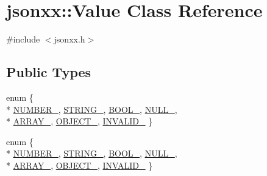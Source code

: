 \hypertarget{classjsonxx_1_1_value}{}\section{jsonxx\+:\+:Value Class Reference}
\label{classjsonxx_1_1_value}


{\ttfamily \#include $<$jsonxx.\+h$>$}

\subsection*{Public Types}
\begin{DoxyCompactItemize}
\item 
enum \{ \\*
\hyperlink{classjsonxx_1_1_value_a20ed4eff7fd265232bfe9e79596ef857a6ef14e8ac168b8fdb1c5dfbfb583045b}{N\+U\+M\+B\+E\+R\+\_\+}, 
\hyperlink{classjsonxx_1_1_value_a20ed4eff7fd265232bfe9e79596ef857a12bc209f234f8b9931d9feaf92e2ba6c}{S\+T\+R\+I\+N\+G\+\_\+}, 
\hyperlink{classjsonxx_1_1_value_a20ed4eff7fd265232bfe9e79596ef857af791553b8f44402500e914c3de70e2e2}{B\+O\+O\+L\+\_\+}, 
\hyperlink{classjsonxx_1_1_value_a20ed4eff7fd265232bfe9e79596ef857a471af58b0c22963c3681bb50fddde57d}{N\+U\+L\+L\+\_\+}, 
\\*
\hyperlink{classjsonxx_1_1_value_a20ed4eff7fd265232bfe9e79596ef857a28a56178628825e168fa96a11a0e4c22}{A\+R\+R\+A\+Y\+\_\+}, 
\hyperlink{classjsonxx_1_1_value_a20ed4eff7fd265232bfe9e79596ef857a50a41ceef6dc2ae9f969388fcff1c05f}{O\+B\+J\+E\+C\+T\+\_\+}, 
\hyperlink{classjsonxx_1_1_value_a20ed4eff7fd265232bfe9e79596ef857a87a10dce222b49f4346f10ce5793fd38}{I\+N\+V\+A\+L\+I\+D\+\_\+}
 \}
\item 
enum \{ \\*
\hyperlink{classjsonxx_1_1_value_a20ed4eff7fd265232bfe9e79596ef857a6ef14e8ac168b8fdb1c5dfbfb583045b}{N\+U\+M\+B\+E\+R\+\_\+}, 
\hyperlink{classjsonxx_1_1_value_a20ed4eff7fd265232bfe9e79596ef857a12bc209f234f8b9931d9feaf92e2ba6c}{S\+T\+R\+I\+N\+G\+\_\+}, 
\hyperlink{classjsonxx_1_1_value_a20ed4eff7fd265232bfe9e79596ef857af791553b8f44402500e914c3de70e2e2}{B\+O\+O\+L\+\_\+}, 
\hyperlink{classjsonxx_1_1_value_a20ed4eff7fd265232bfe9e79596ef857a471af58b0c22963c3681bb50fddde57d}{N\+U\+L\+L\+\_\+}, 
\\*
\hyperlink{classjsonxx_1_1_value_a20ed4eff7fd265232bfe9e79596ef857a28a56178628825e168fa96a11a0e4c22}{A\+R\+R\+A\+Y\+\_\+}, 
\hyperlink{classjsonxx_1_1_value_a20ed4eff7fd265232bfe9e79596ef857a50a41ceef6dc2ae9f969388fcff1c05f}{O\+B\+J\+E\+C\+T\+\_\+}, 
\hyperlink{classjsonxx_1_1_value_a20ed4eff7fd265232bfe9e79596ef857a87a10dce222b49f4346f10ce5793fd38}{I\+N\+V\+A\+L\+I\+D\+\_\+}
 \}
\end{DoxyCompactItemize}
